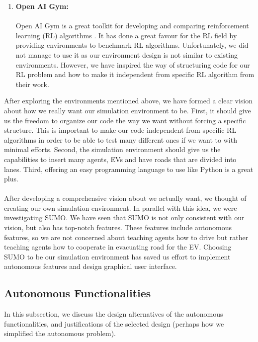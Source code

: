 \begin{enumerate}
    \item \textbf{Open AI Gym:} \\ \\
    Open AI Gym is a great toolkit for developing and comparing reinforcement learning (RL) algorithms \cite{DBLP:journals/corr/BrockmanCPSSTZ16}. It has done a great favour for the RL field by providing environments to benchmark  RL algorithms. Unfortunately, we did not manage to use it as our environment design is not similar to existing environments. However, we have inspired the way of structuring code for our RL problem and how to make it independent from specific RL algorithm from their work.
\end{enumerate}
After exploring the environments mentioned above, we have formed a clear vision about how we really want our simulation environment to be. First, it should give us the freedom to organize our code the way we want without forcing a specific structure. This is important to make our code independent from specific RL algorithms in order to be able to test many different ones if we want to with minimal efforts. Second, the simulation environment should give us the capabilities to insert many agents, EVs and have roads that are divided into lanes. Third, offering an easy programming language to use like Python is a great plus. \\ \\
After developing a comprehensive vision about we actually want, we thought of creating our own simulation environment. In parallel with this idea, we were investigating SUMO. We have seen that SUMO is not only consistent with our vision, but also has top-notch features. These features include autonomous features, so we are not concerned about teaching  agents how to drive but rather  teaching agents how to cooperate in evacuating road for the EV. Choosing SUMO to be our simulation environment has saved us effort to implement autonomous features and design graphical user interface.

\subsection{Autonomous Functionalities}
\label{des_auto_func}
In this subsection, we discuss the design alternatives of the autonomous functionalities, and justifications of the selected design (perhaps how we simplified the autonomous problem).

